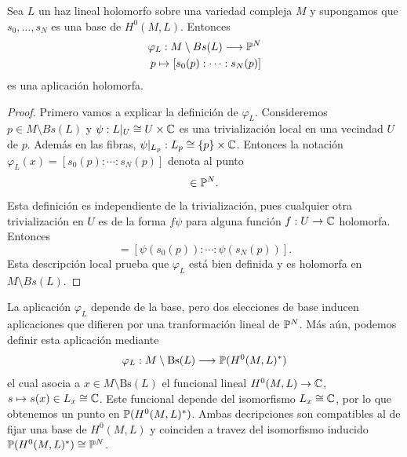 	\begin{propo}
		Sea $L$ un haz lineal holomorfo sobre una variedad compleja $M$ y supongamos que $s_0,\dots,s_N$ es una base de $H^0(M,L)$. Entonces
		\begin{align*}
			\varphi_L:M\setminus Bs(L)\longrightarrow \mathbb{P}^N\\
			p\mapsto [s_0(p):\cdots:s_N(p)]
		\end{align*}
		es una aplicación holomorfa.
	\end{propo}
	\begin{proof}
		Primero vamos a explicar la definición de $\varphi_L$. 
%		
		Consideremos $p\in M\setminus Bs(L)$ y $\psi:L|_U\cong U\times\mathbb{C}$ es una trivialización local en una vecindad $U$ de $p$. Además en las fibras, $\psi|_{L_p}:L_p\cong \{p\}\times \mathbb{C}$. Entonces la notación $\varphi_L(x)=[s_0(p):\cdots:s_N(p)]$ denota al punto
		\begin{equation*}
			[\psi(s_0(p)):\cdots:\psi(s_N(p))]\in\pp^N.
		\end{equation*}	
		Esta definición es independiente de la trivialización, pues cualquier otra trivialización en $U$ es de la forma $f\psi$ para alguna función $f:U\to\mathbb{C}$ holomorfa. Entonces
		\begin{equation*}
			[f(p)\psi(s_0(p)):\cdots:f(p)\psi(s_N(p))]=[\psi(s_0(p)):\cdots:\psi(s_N(p))].
		\end{equation*}
		Esta descripción local prueba que $\varphi_L$ está bien definida y es holomorfa en $M\setminus Bs(L)$.
	\end{proof}
    
    \begin{remark}
    	La aplicación $\varphi_L$ depende de la base, pero dos elecciones de base inducen aplicaciones que difieren por una tranformación lineal de $\mathbb{P}^N$. Más aún, podemos definir esta aplicación mediante
    	\begin{align*}
    		\varphi_L:M\setminus \mathrm{Bs}(L)\longrightarrow\mathbb{P}(H^0(M,L)^*)
    	\end{align*} 
    	el cual asocia a $x\in M\setminus \mathrm{Bs}(L)$ el funcional lineal $H^0(M,L)\to \mathbb{C}$, $s\mapsto s(x)\in L_x\cong\mathbb{C}$. Este funcional depende del isomorfismo $L_x\cong\mathbb{C}$, por lo que obtenemos un punto en $\mathbb{P}(H^0(M,L)^*)$. Ambas decripciones son compatibles al de fijar una base de $H^0(M,L)$ y coinciden a travez del isomorfismo inducido $\mathbb{P}(H^0(M,L)^*)\cong\mathbb{P}^N$.
    \end{remark}

